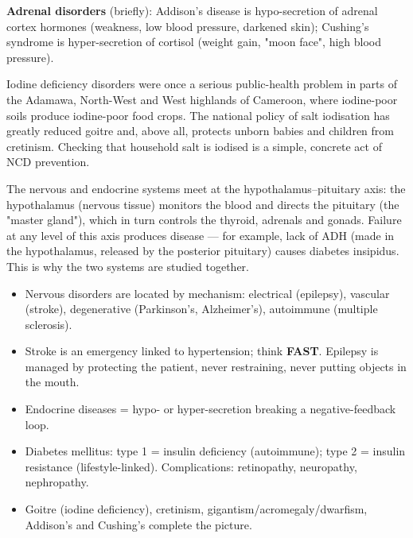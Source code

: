 \documentclass[11pt]{article}
\newcommand{\cle}[1]{{\popxbold\color{popdark}#1}}
\newcounter{popsec}
\newcounter{popsub}
\newcommand{\courssub}[1]{%
  \stepcounter{popsub}%
  \par\vspace{9pt}\noindent{\popxbold\fontsize{11.5}{13}\selectfont\color{popink}{\color{poporange}\thepopsec.\thepopsub}\hspace{6pt}#1}\par\nopagebreak\vspace{4pt}
}
\begin{document}
\textbf{Adrenal disorders} (briefly): \cle{Addison's disease} is hypo-secretion of adrenal cortex hormones (weakness, low blood pressure, darkened skin); \cle{Cushing's syndrome} is hyper-secretion of cortisol (weight gain, "moon face", high blood pressure).

\begin{savaistu}
Iodine deficiency disorders were once a serious public-health problem in parts of the Adamawa, North-West and West highlands of Cameroon, where iodine-poor soils produce iodine-poor food crops. The national policy of \cle{salt iodisation} has greatly reduced goitre and, above all, protects unborn babies and children from cretinism. Checking that household salt is iodised is a simple, concrete act of NCD prevention.
\end{savaistu}

\courssub{Linking the two control systems}

The nervous and endocrine systems meet at the \cle{hypothalamus–pituitary axis}: the hypothalamus (nervous tissue) monitors the blood and directs the pituitary (the "master gland"), which in turn controls the thyroid, adrenals and gonads. Failure at any level of this axis produces disease — for example, lack of ADH (made in the hypothalamus, released by the posterior pituitary) causes diabetes insipidus. This is why the two systems are studied together.

\begin{aretenir}
\begin{itemize}
\item Nervous disorders are located by mechanism: electrical (epilepsy), vascular (stroke), degenerative (Parkinson's, Alzheimer's), autoimmune (multiple sclerosis).
\item Stroke is an emergency linked to hypertension; think \textbf{FAST}. Epilepsy is managed by protecting the patient, never restraining, never putting objects in the mouth.
\item Endocrine diseases = hypo- or hyper-secretion breaking a negative-feedback loop.
\item Diabetes mellitus: type 1 = insulin deficiency (autoimmune); type 2 = insulin resistance (lifestyle-linked). Complications: retinopathy, neuropathy, nephropathy.
\item Goitre (iodine deficiency), cretinism, gigantism/acromegaly/dwarfism, Addison's and Cushing's complete the picture.
\end{itemize}
\end{aretenir}
\end{document}
